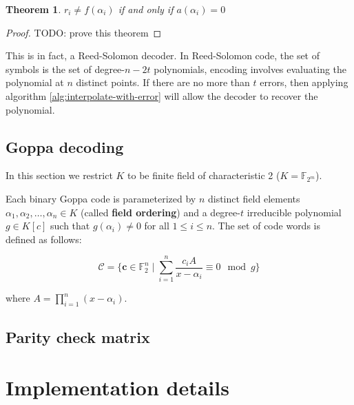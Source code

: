 \documentclass{article}
\newtheorem{theorem}{Theorem}[section]
\begin{document}
\begin{theorem}
    $r_i \neq f(\alpha_i)$ if and only if $a(\alpha_i) = 0$
\end{theorem}

\begin{proof}
    TODO: prove this theorem
\end{proof}

This is in fact, a Reed-Solomon decoder. In Reed-Solomon code, the set of symbols is the set of degree-$n-2t$ polynomials, encoding involves evaluating the polynomial at $n$ distinct points. If there are no more than $t$ errors, then applying algorithm \ref{alg:interpolate-with-error} will allow the decoder to recover the polynomial.

\subsection{Goppa decoding}
In this section we restrict $K$ to be finite field of characteristic 2 ($K = \mathbb{F}_{2^m}$).

Each binary Goppa code is parameterized by $n$ distinct field elements $\alpha_1, \alpha_2, \ldots, \alpha_n \in K$ (called \textbf{field ordering}) and a degree-$t$ irreducible polynomial $g\in K[c]$ such that $g(\alpha_i)\neq 0$ for all $1 \leq i \leq n$. The set of code words is defined as follows:

\begin{equation*}
    \mathcal{C} = \{
        \mathbf{c} \in \mathbb{F}_2^n 
        \mid \sum_{i=1}^n \frac{c_iA}{x - \alpha_i} \equiv 0 \mod g
    \}
\end{equation*}

where $A = \prod_{i=1}^n(x - \alpha_i)$.

\subsection{Parity check matrix}

\section{Implementation details}



\end{document}
